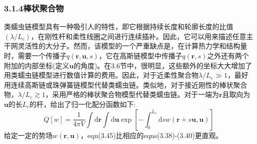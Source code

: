 \subsubsection{3.1.4棒状聚合物}
类蠕虫链模型具有一种吸引人的特性，即它根据持续长度和轮廓长度的比值$(\lambda/L_c)$，在刚性杆和柔性线圈之间进行连续插补。因此，它可以用来描述任意主干网灵活性的大分子。然而，该模型的一个严重缺点是，在计算热力学和结构量时，需要一个传播子$q(\mathbf{r},\mathbf{u},s)$，它在高斯链模型中传播子$q(\mathbf{r},s)$之外还有两个附加的内部坐标(定义$\mathbf{u}$的角度)。在3.6节中，很明显，这些额外的坐标大大增加了用类蠕虫链模型进行数值计算的费用。因此，对于近柔性聚合物$\lambda/L_c\gg 1$，最好用连续高斯链或珠弹簧链模型代替类蠕虫链。类似地，对于接近刚性的棒状聚合物，$\lambda/L_c\gtrsim 1$，采用严格的棒状聚合物模型代替类蠕虫链。对于一端为$\mathbf{r}$且取向为$\mathbf{u}$的长$L_c$的杆，给出了归一化配分函数如下:
\begin{equation}
Q[w]=\frac{1}{4\pi V}\int\mathrm{d}\mathbf{r}\int\mathrm{d}\mathbf{u}\exp\left[-\int_0^{L_c}\mathrm{d}sw(\mathbf{r}+s\mathbf{u},\mathbf{u})\right]
\end{equation}
给定一定的势场$w(\mathbf{r},\mathbf{u})$，eqn(3.45)比相应的eqns(3.38)-(3.40)更直观。










































































































